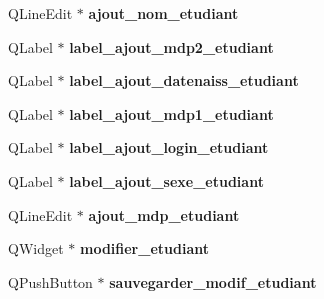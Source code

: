 \begin{DoxyCompactItemize}
\item 
\hypertarget{class_ui___administration_ac50552afe195506a5d21f54a855d7e78}{Q\+Line\+Edit $\ast$ {\bfseries ajout\+\_\+nom\+\_\+etudiant}}\label{class_ui___administration_ac50552afe195506a5d21f54a855d7e78}

\item 
\hypertarget{class_ui___administration_aa5479234e64b4d2c769998cbeace95fb}{Q\+Label $\ast$ {\bfseries label\+\_\+ajout\+\_\+mdp2\+\_\+etudiant}}\label{class_ui___administration_aa5479234e64b4d2c769998cbeace95fb}

\item 
\hypertarget{class_ui___administration_a1c14408791c40ca64a90a1ddd6fef819}{Q\+Label $\ast$ {\bfseries label\+\_\+ajout\+\_\+datenaiss\+\_\+etudiant}}\label{class_ui___administration_a1c14408791c40ca64a90a1ddd6fef819}

\item 
\hypertarget{class_ui___administration_a56c0bd815621913574450ea09889f673}{Q\+Label $\ast$ {\bfseries label\+\_\+ajout\+\_\+mdp1\+\_\+etudiant}}\label{class_ui___administration_a56c0bd815621913574450ea09889f673}

\item 
\hypertarget{class_ui___administration_a80a65ec378752d8931a54aa0836ed58f}{Q\+Label $\ast$ {\bfseries label\+\_\+ajout\+\_\+login\+\_\+etudiant}}\label{class_ui___administration_a80a65ec378752d8931a54aa0836ed58f}

\item 
\hypertarget{class_ui___administration_aa62ae15bc241f9d73d432cb9bf878219}{Q\+Label $\ast$ {\bfseries label\+\_\+ajout\+\_\+sexe\+\_\+etudiant}}\label{class_ui___administration_aa62ae15bc241f9d73d432cb9bf878219}

\item 
\hypertarget{class_ui___administration_ade576ec76c07f809fad2eb01cd4e3383}{Q\+Line\+Edit $\ast$ {\bfseries ajout\+\_\+mdp\+\_\+etudiant}}\label{class_ui___administration_ade576ec76c07f809fad2eb01cd4e3383}

\item 
\hypertarget{class_ui___administration_ae305789185d54615401f84bca583b7d9}{Q\+Widget $\ast$ {\bfseries modifier\+\_\+etudiant}}\label{class_ui___administration_ae305789185d54615401f84bca583b7d9}

\item 
\hypertarget{class_ui___administration_a27fef67e3addc0ea264e291c748a6675}{Q\+Push\+Button $\ast$ {\bfseries sauvegarder\+\_\+modif\+\_\+etudiant}}\label{class_ui___administration_a27fef67e3addc0ea264e291c748a6675}


\end{DoxyCompactItemize}
